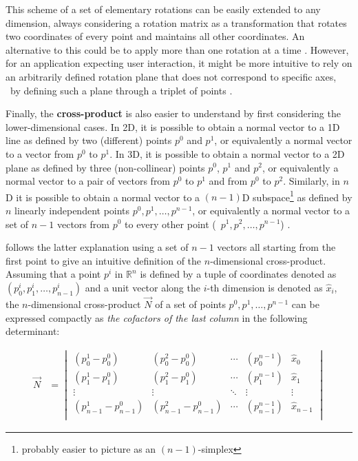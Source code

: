 This scheme of a set of elementary rotations can be easily extended to any dimension, always considering a rotation matrix as a transformation that rotates two coordinates of every point and maintains all other coordinates.
An alternative to this could be to apply more than one rotation at a time \citep{vanElfrinkhof97}.
However, for an application expecting user interaction, it might be more intuitive to rely on an arbitrarily defined rotation plane that does not correspond to specific axes, \eg\ by defining such a plane through a triplet of points \citep{Hanson94}.

Finally, the \textbf{cross-product} is also easier to understand by first considering the lower-dimensional cases.
In 2D, it is possible to obtain a normal vector to a 1D line as defined by two (different) points $p^0$ and $p^1$, or equivalently a normal vector to a vector from $p^0$ to $p^1$.
In 3D, it is possible to obtain a normal vector to a 2D plane as defined by three (non-collinear) points $p^0$, $p^1$ and $p^2$, or equivalently a normal vector to a pair of vectors from $p^0$ to $p^1$ and from $p^0$ to $p^2$.
Similarly, in $n$D it is possible to obtain a normal vector to a $(n-1)$D subspace\footnote{probably easier to picture as an $(n-1)$-simplex} as defined by $n$ linearly independent points $p^0, p^1, \ldots, p^{n-1}$, or equivalently a normal vector to a set of $n-1$ vectors from $p^0$ to every other point (\ie\ $p^1, p^2, \ldots, p^{n-1}$) \citep{Massey83,Elduque04}.

\citet{Hanson94} follows the latter explanation using a set of $n-1$ vectors all starting from the first point to give an intuitive definition of the $n$-dimensional cross-product.
Assuming that a point $p^i$ in $\mathbb{R}^n$ is defined by a tuple of coordinates denoted as $(p^i_0, p^i_1, \ldots, p^i_{n-1})$ and a unit vector along the $i$-th dimension is denoted as $\hat{x}_i$, the $n$-dimensional cross-product $\vec{N}$ of a set of points $p^0, p^1, \ldots, p^{n-1}$ can be expressed compactly as \emph{the cofactors of the last column} in the following determinant:

\begin{align*}
\vec{N} &= \begin{vmatrix}
(p^1_0 - p^0_0) & (p^2_0 - p^0_0) & \cdots & (p^{n-1}_0) & \hat{x}_0 \\
(p^1_1 - p^0_1) & (p^2_1 - p^0_1) & \cdots & (p^{n-1}_1) & \hat{x}_1 \\
\vdots & \vdots & \ddots & \vdots & \vdots \\
(p^1_{n-1} - p^0_{n-1}) & (p^2_{n-1} - p^0_{n-1}) & \cdots & (p^{n-1}_{n-1}) & \hat{x}_{n-1} \\
\end{vmatrix}
\end{align*}

